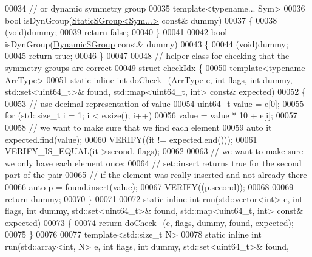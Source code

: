 \begin{DoxyCode}
00034 \textcolor{comment}{// or dynamic symmetry group}
00035 \textcolor{keyword}{template}<\textcolor{keyword}{typename}... Sym>
00036 \textcolor{keywordtype}{bool} isDynGroup(\hyperlink{class_eigen_1_1_static_s_group}{StaticSGroup<Sym...>} \textcolor{keyword}{const}& dummy)
00037 \{
00038   (void)dummy;
00039   \textcolor{keywordflow}{return} \textcolor{keyword}{false};
00040 \}
00041 
00042 \textcolor{keywordtype}{bool} isDynGroup(\hyperlink{class_eigen_1_1_dynamic_s_group}{DynamicSGroup} \textcolor{keyword}{const}& dummy)
00043 \{
00044   (void)dummy;
00045   \textcolor{keywordflow}{return} \textcolor{keyword}{true};
00046 \}
00047 
00048 \textcolor{comment}{// helper class for checking that the symmetry groups are correct}
00049 \textcolor{keyword}{struct }\hyperlink{structcheck_idx}{checkIdx} \{
00050   \textcolor{keyword}{template}<\textcolor{keyword}{typename} ArrType>
00051   \textcolor{keyword}{static} \textcolor{keyword}{inline} \textcolor{keywordtype}{int} doCheck\_(ArrType e, \textcolor{keywordtype}{int} flags, \textcolor{keywordtype}{int} dummy, std::set<uint64\_t>& found, std::map<uint64\_t,
       int> \textcolor{keyword}{const}& expected)
00052   \{
00053     \textcolor{comment}{// use decimal representation of value}
00054     uint64\_t value = e[0];
00055     \textcolor{keywordflow}{for} (std::size\_t i = 1; i < e.size(); i++)
00056       value = value * 10 + e[i];
00057 
00058     \textcolor{comment}{// we want to make sure that we find each element}
00059     \textcolor{keyword}{auto} it = expected.find(value);
00060     VERIFY((it != expected.end()));
00061     VERIFY\_IS\_EQUAL(it->second, flags);
00062 
00063     \textcolor{comment}{// we want to make sure we only have each element once;}
00064     \textcolor{comment}{// set::insert returns true for the second part of the pair}
00065     \textcolor{comment}{// if the element was really inserted and not already there}
00066     \textcolor{keyword}{auto} p = found.insert(value);
00067     VERIFY((p.second));
00068 
00069     \textcolor{keywordflow}{return} dummy;
00070   \}
00071 
00072   \textcolor{keyword}{static} \textcolor{keyword}{inline} \textcolor{keywordtype}{int} run(std::vector<int> e, \textcolor{keywordtype}{int} flags, \textcolor{keywordtype}{int} dummy, std::set<uint64\_t>& found, 
      std::map<uint64\_t, int> \textcolor{keyword}{const}& expected)
00073   \{
00074     \textcolor{keywordflow}{return} doCheck\_(e, flags, dummy, found, expected);
00075   \}
00076 
00077   \textcolor{keyword}{template}<std::\textcolor{keywordtype}{size\_t} N>
00078   \textcolor{keyword}{static} \textcolor{keyword}{inline} \textcolor{keywordtype}{int} run(std::array<int, N> e, \textcolor{keywordtype}{int} flags, \textcolor{keywordtype}{int} dummy, std::set<uint64\_t>& found, 

\end{DoxyCode}

